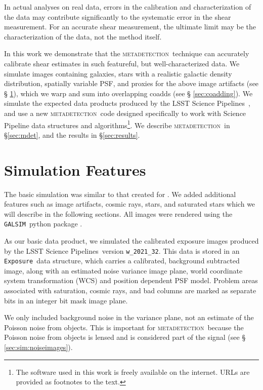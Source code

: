 \documentclass[twocolumn,twocolappendix,astrosym]{openjournal}
\newcommand{\galsim}{\texttt{GALSIM}}
\newcommand{\calexp}{\texttt{Exposure}}
\newcommand{\dm}{LSST Science Pipelines}
\newcommand{\mdet}{\textsc{metadetection}}
\begin{document}
In actual analyses on real data, errors in the calibration and characterization
of the data may contribute significantly to the systematic error in the shear
measurement.  For an accurate shear measurement, the ultimate limit may be the
characterization of the data, not the method itself.

In this work we demonstrate that the \mdet\ technique can accurately calibrate
shear estimates in such featureful, but well-characterized data.  We simulate images
containing galaxies, stars with a realistic galactic density distribution,
spatially variable PSF, and proxies for the above image artifacts (see \S
\ref{sec:sim}), which we warp and sum into overlapping coadds (see \S
\ref{sec:coadding}).  We simulate the expected data products produced by the
\dm\ \citep{BoschLSST2019,BoschHSC2017}, and use
a new \mdet\ code designed specifically to work with Science Pipeline data structures
and algorithms\footnote{The software used in this work is freely available on
the internet.  URLs are provided as footnotes to the text.}.  We describe
\mdet\ in \S \ref{sec:mdet}, and the results in \S \ref{sec:results}.

\section{Simulation Features} \label{sec:sim}

The basic simulation was similar to that created for \citep{mdet20}.  We added
additional features such as image artifacts, cosmic rays, stars, and saturated
stars which we will describe in the following sections.  All images were
rendered using the \galsim\ python package \citep{galsim2015}.

As our basic data product, we simulated the calibrated exposure images produced
by the \dm\ version \texttt{w\_2021\_32}.  This data is stored in an \calexp\
data structure, which carries a calibrated, background subtracted image, along
with an estimated noise variance image plane, world coordinate system
transformation (WCS) and position dependent PSF model.  Problem areas
associated with saturation, cosmic rays, and bad columns are marked as separate
bits in an integer bit mask image plane.

We only included background noise in the variance plane, not an estimate of the
Poisson noise from objects.  This is important for \mdet\ because the Poisson
noise from objects is lensed and is considered part of the signal (see \S
\ref{sec:sim:noiseimages}).
\end{document}
